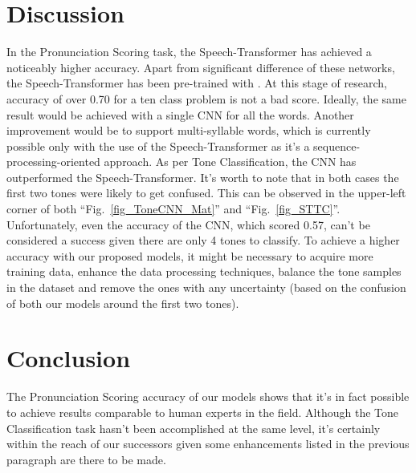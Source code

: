 \documentclass[conference]{IEEEtran}
\begin{document}
\section{Discussion}
In the Pronunciation Scoring task, the Speech-Transformer has achieved a noticeably higher accuracy. Apart from significant difference of these networks, the Speech-Transformer has been pre-trained with \cite{shi2021aishell3multispeakermandarintts}. At this stage of research, accuracy of over 0.70 for a ten class problem is not a bad score. Ideally, the same result would be achieved with a single CNN for all the words.
Another improvement would be to support multi-syllable words, which is currently possible only with the use of the Speech-Transformer as it's a sequence-processing-oriented approach.
As per Tone Classification, the CNN has outperformed the Speech-Transformer. It's worth to note that in both cases the first two tones were likely to get confused. This can be observed in the upper-left corner of both ``Fig.~\ref{fig_ToneCNN_Mat}'' and ``Fig.~\ref{fig_STTC}''. Unfortunately, even the accuracy of the CNN, which scored 0.57, can't be considered a success given there are only 4 tones to classify. To achieve a higher accuracy with our proposed models, it might be necessary to acquire more training data, enhance the data processing techniques, balance the tone samples in the dataset and remove the ones with any uncertainty (based on the confusion of both our models around the first two tones).

\section{Conclusion}
The Pronunciation Scoring accuracy of our models shows that it's in fact possible to achieve results comparable to human experts in the field. Although the Tone Classification task hasn't been accomplished at the same level, it's certainly within the reach of our successors given some enhancements listed in the previous paragraph are there to be made.
\end{document}
